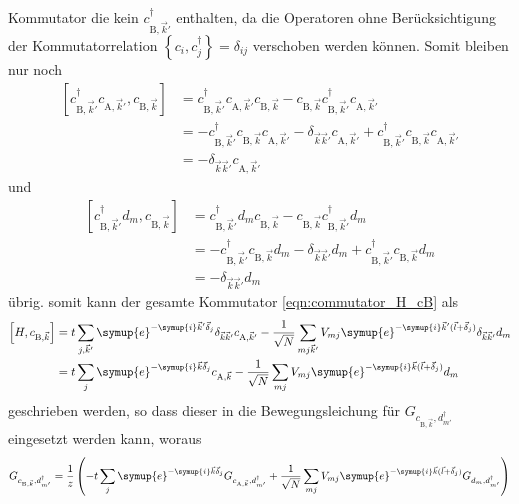 Kommutator die kein $c^\dagger_{\text{B},\vec{k}'}$ enthalten, da die Operatoren ohne Berücksichtigung der Kommutatorrelation 
$\left \{ c_i, c^\dagger_j \right \} = \delta_{ij}$ verschoben werden können.
Somit bleiben nur noch 
\begin{align*}
    \left [ c^\dagger_{\text{B},\vec{k}'} c_{\text{A},\vec{k}'}, c_{\text{B},\vec{k}} \right ]
        &= c^\dagger_{\text{B},\vec{k}'} c_{\text{A},\vec{k}'} c_{\text{B},\vec{k}} - c_{\text{B},\vec{k}} c^\dagger_{\text{B},\vec{k}'} c_{\text{A},\vec{k}'} \\
        &= - c^\dagger_{\text{B},\vec{k}'} c_{\text{B},\vec{k}} c_{\text{A},\vec{k}'} - \delta_{\vec{k}\vec{k}'} c_{\text{A},\vec{k}'}
        + c^\dagger_{\text{B},\vec{k}'} c_{\text{B},\vec{k}} c_{\text{A},\vec{k}'} \\
        &=  - \delta_{\vec{k}\vec{k}'} c_{\text{A},\vec{k}'}
\end{align*}
und 
\begin{align*}
    \left [ c^\dagger_{\text{B},\vec{k}'} d_m, c_{\text{B},\vec{k}} \right ] &=
        c^\dagger_{\text{B},\vec{k}'} d_m c_{\text{B},\vec{k}} - c_{\text{B},\vec{k}} c^\dagger_{\text{B},\vec{k}'} d_m \\
        &= - c^\dagger_{\text{B},\vec{k}'} c_{\text{B},\vec{k}} d_m - \delta_{\vec{k}\vec{k}'} d_m + c^\dagger_{\text{B},\vec{k}'} c_{\text{B},\vec{k}} d_m \\
        &= - \delta_{\vec{k}\vec{k}'} d_m
\end{align*}
übrig.
somit kann der gesamte Kommutator \eqref{eqn:commutator_H_cB} als 
\begin{align*}
    \left [ H, c_{\text{B},\vec{k}} \right ]
     &= t \sum_{j,\vec{k}'} \symup{e}^{-\symup{i}\vec{k}' \vec{\delta}_j} \delta_{\vec{k}\vec{k}'} c_{\text{A},\vec{k}'}
      - \frac{1}{\sqrt{N}}\sum_{mj\vec{k}'} V_{mj} \symup{e}^{-\symup{i}\vec{k}' (\vec{l} + \vec{\delta}_j)} \delta_{\vec{k}\vec{k}'} d_m  \\
     &=  t \sum_{j} \symup{e}^{-\symup{i}\vec{k} \vec{\delta}_j} c_{\text{A},\vec{k}}
     - \frac{1}{\sqrt{N}}\sum_{mj} V_{mj} \symup{e}^{-\symup{i}\vec{k} (\vec{l} + \vec{\delta}_j)} d_m
\end{align*}
geschrieben werden, so dass dieser in die Bewegungsleichung für $G_{c_{\text{B},\vec{k}}, d^\dagger_{m'}}$ eingesetzt werden kann, woraus
\begin{align}
    G_{c_{\text{B},\vec{k}}, d^\dagger_{m'}} =\frac{1}{z} \left (- t \sum_{j} \symup{e}^{-\symup{i}\vec{k} \vec{\delta}_j} G_{c_{\text{A},\vec{k}},d^\dagger_{m'}} + 
    \frac{1}{\sqrt{N}} \sum_{mj} V_{mj} \symup{e}^{-\symup{i}\vec{k} (\vec{l}+ \vec{\delta}_j)} G_{d_m, d_{m'}^\dagger} \right )  \label{eqn:greensfunction_cB}
\end{align}
